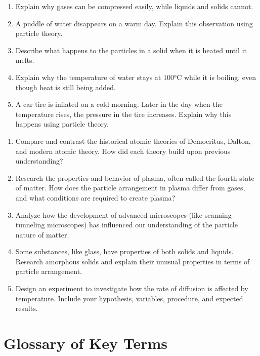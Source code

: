 \documentclass[justified,notoc]{tufte-book}
\newenvironment{tieredquestions}[1]{%
    \begin{tcolorbox}[colback=note!30,colframe=note!50,title=\textbf{Practice Questions - #1}]
}{%
    \end{tcolorbox}
}
\begin{document}
\begin{tieredquestions}{Level 2 - Application}
\begin{enumerate}
    \item Explain why gases can be compressed easily, while liquids and solids cannot.
    \item A puddle of water disappears on a warm day. Explain this observation using particle theory.
    \item Describe what happens to the particles in a solid when it is heated until it melts.
    \item Explain why the temperature of water stays at 100°C while it is boiling, even though heat is still being added.
    \item A car tire is inflated on a cold morning. Later in the day when the temperature rises, the pressure in the tire increases. Explain why this happens using particle theory.
\end{enumerate}
\end{tieredquestions}

\begin{tieredquestions}{Level 3 - Extension and Analysis}
\begin{enumerate}
    \item Compare and contrast the historical atomic theories of Democritus, Dalton, and modern atomic theory. How did each theory build upon previous understanding?
    \item Research the properties and behavior of plasma, often called the fourth state of matter. How does the particle arrangement in plasma differ from gases, and what conditions are required to create plasma?
    \item Analyze how the development of advanced microscopes (like scanning tunneling microscopes) has influenced our understanding of the particle nature of matter.
    \item Some substances, like glass, have properties of both solids and liquids. Research amorphous solids and explain their unusual properties in terms of particle arrangement.
    \item Design an experiment to investigate how the rate of diffusion is affected by temperature. Include your hypothesis, variables, procedure, and expected results.
\end{enumerate}
\end{tieredquestions}

\section{Glossary of Key Terms}
\end{document}
